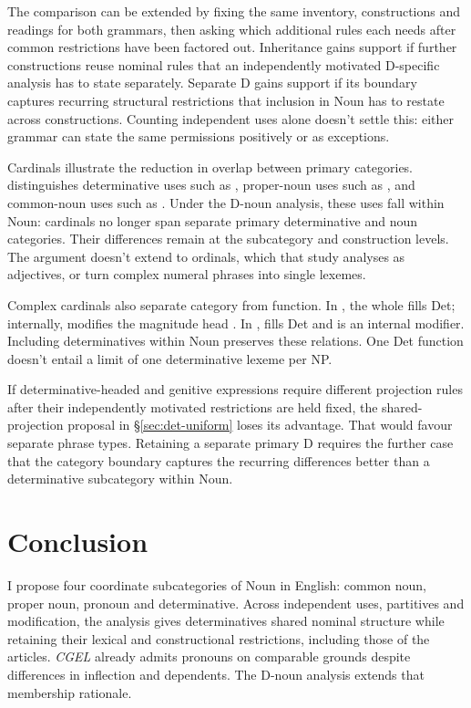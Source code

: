 \documentclass[12pt]{article}
\begin{document}
The comparison can be extended by fixing the same inventory, constructions and readings for both grammars, then asking which additional rules each needs after common restrictions have been factored out. Inheritance gains support if further constructions reuse nominal rules that an independently motivated D-specific analysis has to state separately. Separate D gains support if its boundary captures recurring structural restrictions that inclusion in Noun has to restate across constructions. Counting independent uses alone doesn't settle this: either grammar can state the same permissions positively or as exceptions.

Cardinals illustrate the reduction in overlap between primary categories. \textcite{reynolds2026numerals} distinguishes determinative uses such as , proper-noun uses such as , and common-noun uses such as . Under the D-noun analysis, these uses fall within Noun: cardinals no longer span separate primary determinative and noun categories. Their differences remain at the subcategory and construction levels. The argument doesn't extend to ordinals, which that study analyses as adjectives, or turn complex numeral phrases into single lexemes.

Complex cardinals also separate category from function. In , the whole  fills Det; internally,  modifies the magnitude head  \citep[§4]{reynolds2026numerals}. In ,  fills Det and  is an internal modifier. Including determinatives within Noun preserves these relations. One Det function doesn't entail a limit of one determinative lexeme per NP.

If determinative-headed and genitive expressions require different projection rules after their independently motivated restrictions are held fixed, the shared-projection proposal in §\ref{sec:det-uniform} loses its advantage. That would favour separate phrase types. Retaining a separate primary D requires the further case that the category boundary captures the recurring differences better than a determinative subcategory within Noun.

\section{Conclusion}\label{sec:conclusion}

I propose four coordinate subcategories of Noun in English: common noun, proper noun, pronoun and determinative. Across independent uses, partitives and modification, the analysis gives determinatives shared nominal structure while retaining their lexical and constructional restrictions, including those of the articles. \textit{CGEL} already admits pronouns on comparable grounds despite differences in inflection and dependents. The D-noun analysis extends that membership rationale.
\end{document}
